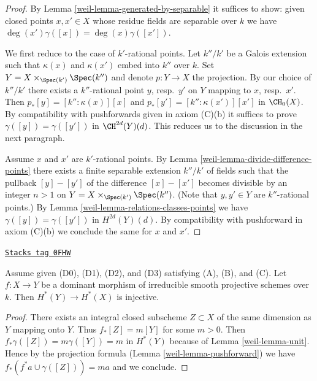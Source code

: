 \begin{proof}

By Lemma \ref{weil-lemma-generated-by-separable} it suffices to show: given
closed points $x, x' \in X$ whose residue fields are separable over $k$
we have $\deg(x') \gamma([x]) = \deg(x) \gamma([x'])$.

\medskip\noindent
We first reduce to the case of $k'$-rational points. Let $k''/k'$ be a
Galois extension such that $\kappa(x)$ and $\kappa(x')$ embed into $k''$
over $k$. Set $Y = X \times_{\Spec(k')} \Spec(k'')$ and denote $p : Y \to X$
the projection. By our choice of $k''/k'$ there exists a
$k''$-rational point $y$, resp.\ $y'$ on $Y$ mapping to $x$, resp.\ $x'$.
Then $p_*[y] = [k'' : \kappa(x)][x]$ and
$p_*[y'] = [k'' : \kappa(x')][x']$ in $\CH_0(X)$.
By compatibility with pushforwards given in axiom (C)(b)
it suffices to prove $\gamma([y]) = \gamma([y'])$ in $\CH^{2d}(Y)(d)$.
This reduces us to the discussion in the next paragraph.

\medskip\noindent
Assume $x$ and $x'$ are $k'$-rational points. By
Lemma \ref{weil-lemma-divide-difference-points} there
exists a finite separable extension $k''/k'$ of fields
such that the pullback $[y] - [y']$
of the difference $[x] - [x']$ becomes divisible
by an integer $n > 1$ on $Y = X \times_{\Spec(k')} \Spec(k'')$.
(Note that $y, y' \in Y$ are $k''$-rational points.)
By Lemma \ref{weil-lemma-relations-classes-points} we have
$\gamma([y]) = \gamma([y'])$ in $H^{2d}(Y)(d)$.
By compatibility with pushforward in axiom (C)(b)
we conclude the same for $x$ and $x'$.
\end{proof}

\begin{lemma}[Injective]
\label{weil-lemma-injective}
\href{https://stacks.math.columbia.edu/tag/0FHW}{\texttt{Stacks tag 0FHW}}

Assume given (D0), (D1), (D2), and (D3) satisfying (A), (B), and (C). Let
$f : X \to Y$ be a dominant morphism of irreducible smooth projective schemes
over $k$. Then $H^*(Y) \to H^*(X)$ is injective.
\end{lemma}

\begin{proof}

There exists an integral closed subscheme $Z \subset X$ of the same
dimension as $Y$ mapping onto $Y$. Thus $f_*[Z] = m[Y]$ for some $m > 0$.
Then $f_* \gamma([Z]) = m \gamma([Y]) = m$ in $H^*(Y)$ because of
Lemma \ref{weil-lemma-unit}. Hence by the projection formula
(Lemma \ref{weil-lemma-pushforward})
we have $f_*(f^*a \cup \gamma([Z])) = m a$ and we conclude.
\end{proof}

